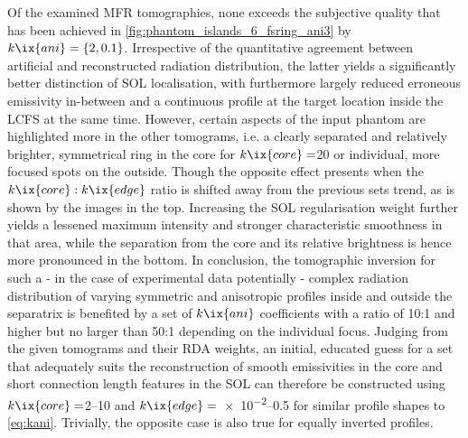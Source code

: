                 Of the examined MFR tomographies, none exceeds the subjective quality that has been achieved in \cref{fig:phantom_islands_6_fsring_ani3} by $k\ix{ani}=\left\{2, 0.1\right\}$. Irrespective of the quantitative agreement between artificial and reconstructed radiation distribution, the latter yields a significantly better distinction of SOL localisation, with furthermore largely reduced erroneous emissivity in-between and a continuous profile at the target location inside the LCFS at the same time. However, certain aspects of the input phantom are highlighted more in the other tomograms, i.e. a clearly separated and relatively brighter, symmetrical ring in the core for $k\ix{core}=$\SI{20}{\arbitraryunit} or individual, more focused spots on the outside. Though the opposite effect presents when the $k\ix{core}:k\ix{edge}$ ratio is shifted away from the previous sets trend, as is shown by the images in the top. Increasing the SOL regularisation weight further yields a lessened maximum intensity and stronger characteristic smoothness in that area, while the separation from the core and its relative brightness is hence more pronounced in the bottom. In conclusion, the tomographic inversion for such a - in the case of experimental data potentially - complex radiation distribution of varying symmetric and anisotropic profiles inside and outside the separatrix is benefited by a set of $k\ix{ani}$ coefficients with a ratio of 10:1 and higher but no larger than 50:1 depending on the individual focus. Judging from the given tomograms and their RDA weights, an initial, educated guess for a set that adequately suits the reconstruction of smooth emissivities in the core and short connection length features in the SOL can therefore be constructed using $k\ix{core}=$\SIrange{2}{10}{\arbitraryunit} and $k\ix{edge}=$\SIrange{e-2}{0.5}{\arbitraryunit} for similar profile shapes to \cref{eq:kani}. Trivially, the opposite case is also true for equally inverted profiles.%
%

